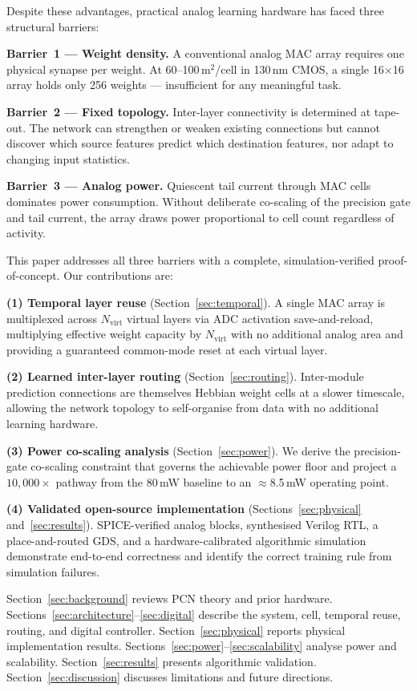 \documentclass[journal,10pt,twoside]{IEEEtran}
\begin{document}
Despite these advantages, practical analog learning hardware has faced
three structural barriers:

\textbf{Barrier~1 — Weight density.}
A conventional analog MAC array requires one physical synapse per weight.
At 60--100\,\textmu m$^2$/cell in 130\,nm CMOS,
a single 16$\times$16 array holds only 256 weights — insufficient for
any meaningful task.

\textbf{Barrier~2 — Fixed topology.}
Inter-layer connectivity is determined at tape-out.
The network can strengthen or weaken existing connections but cannot
discover which source features predict which destination features,
nor adapt to changing input statistics.

\textbf{Barrier~3 — Analog power.}
Quiescent tail current through MAC cells dominates power consumption.
Without deliberate co-scaling of the precision gate and tail current,
the array draws power proportional to cell count regardless of activity.

This paper addresses all three barriers with a complete, simulation-verified
proof-of-concept.
Our contributions are:

\textbf{(1) Temporal layer reuse} (Section~\ref{sec:temporal}).
A single MAC array is multiplexed across $N_\text{virt}$ virtual layers via
ADC activation save-and-reload, multiplying effective weight capacity by
$N_\text{virt}$ with no additional analog area and providing a guaranteed
common-mode reset at each virtual layer.

\textbf{(2) Learned inter-layer routing} (Section~\ref{sec:routing}).
Inter-module prediction connections are themselves Hebbian weight cells at
a slower timescale, allowing the network topology to self-organise from
data with no additional learning hardware.

\textbf{(3) Power co-scaling analysis} (Section~\ref{sec:power}).
We derive the precision-gate co-scaling constraint that governs the achievable
power floor and project a $10{,}000\times$ pathway from the 80\,mW baseline
to an $\approx$8.5\,mW operating point.

\textbf{(4) Validated open-source implementation} (Sections~\ref{sec:physical}
and~\ref{sec:results}).
SPICE-verified analog blocks, synthesised Verilog RTL, a place-and-routed
GDS, and a hardware-calibrated algorithmic simulation demonstrate end-to-end
correctness and identify the correct training rule from simulation failures.

Section~\ref{sec:background} reviews PCN theory and prior hardware.
Sections~\ref{sec:architecture}--\ref{sec:digital} describe the system,
cell, temporal reuse, routing, and digital controller.
Section~\ref{sec:physical} reports physical implementation results.
Sections~\ref{sec:power}--\ref{sec:scalability} analyse power and
scalability.
Section~\ref{sec:results} presents algorithmic validation.
Section~\ref{sec:discussion} discusses limitations and future directions.
\end{document}
